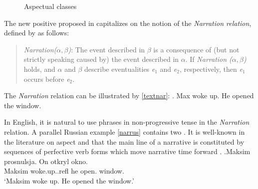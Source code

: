 \begin{figure}
\caption{\label{circles}Aspectual classes}
\end{figure}

The new positive  proposed in \citet{ZinovaFilip:13} capitalizes on the notion of the \textit{Narration relation}, defined by \citet{Lascarides:93} as follows:

\begin{quote}
\textit{Narration($\alpha,\beta$)}: The event described in $\beta$ is a consequence of (but not strictly speaking caused by) the event described in $\alpha$. If \textit{Narration ($\alpha,\beta$)} holds, and $\alpha$ and $\beta$ describe eventualities \textit{e$_1$} and \textit{e$_2$}, respectively, then \textit{e$_1$} occurs before \textit{e$_2$}.
\end{quote}

The \textit{Narration} relation can be illustrated by \ref{textnar}: 
\ex.\label{textnar} Max woke up. He opened the window. 

In English, it is natural to use  phrases in non-progressive tense in the \textit{Narration} relation. A parallel Russian example \ref{narrus} contains two . It is well-known  in the literature on aspect and  that the main line of a narrative is constituted by sequences of perfective verb forms which move narrative time forward \citep[for Russian, see in particular][]{Paducheva:96, Paducheva:04}.
\exg.\label{narrus}Maksim prosnulsja\textsuperscript{\PF}. On otkryl\textsuperscript{\PF} okno.\\
Maksim woke.up..refl he open. window.\\
\trans `Maksim woke up. He opened the window.'

